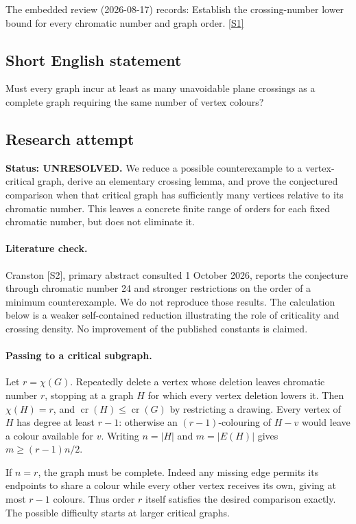 \documentclass[11pt,a4paper]{article}
\newcommand{\sref}[2]{\hyperlink{source:#1:#2}{[S#2]}}
\begin{document}
The embedded review (2026-08-17) records: Establish the crossing-number lower bound for every chromatic number and graph order. \sref{statement}{1}

\subsection{Short English statement}

Must every graph incur at least as many unavoidable plane crossings as a complete graph requiring the same number of vertex colours?

\subsection{Research attempt}
\textbf{Status: UNRESOLVED.} We reduce a possible counterexample to a vertex-critical graph, derive an elementary crossing lemma, and prove the conjectured comparison when that critical graph has sufficiently many vertices relative to its chromatic number. This leaves a concrete finite range of orders for each fixed chromatic number, but does not eliminate it.

\paragraph{Literature check.}
Cranston [S2], primary abstract consulted 1 October 2026, reports the conjecture through chromatic number 24 and stronger restrictions on the order of a minimum counterexample. We do not reproduce those results. The calculation below is a weaker self-contained reduction illustrating the role of criticality and crossing density. No improvement of the published constants is claimed.

\paragraph{Passing to a critical subgraph.}
Let $r=\chi(G)$. Repeatedly delete a vertex whose deletion leaves chromatic number $r$, stopping at a graph $H$ for which every vertex deletion lowers it. Then $\chi(H)=r$, and $\operatorname{cr}(H)\le\operatorname{cr}(G)$ by restricting a drawing. Every vertex of $H$ has degree at least $r-1$: otherwise an $(r-1)$-colouring of $H-v$ would leave a colour available for $v$. Writing $n=|H|$ and $m=|E(H)|$ gives $m\ge(r-1)n/2$.

If $n=r$, the graph must be complete. Indeed any missing edge permits its endpoints to share a colour while every other vertex receives its own, giving at most $r-1$ colours. Thus order $r$ itself satisfies the desired comparison exactly. The possible difficulty starts at larger critical graphs.
\end{document}
